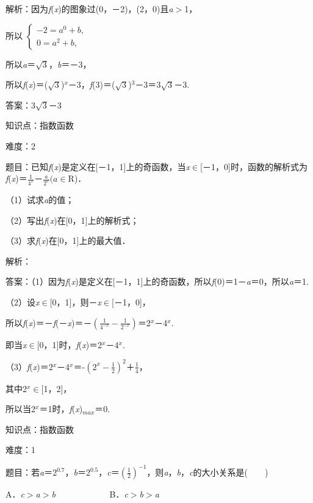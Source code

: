 \documentclass{article} %
\begin{document}
解析：因为\textit{f}(\textit{x})的图象过(0，－2)，(2，0)且\textit{a}$\mathrm{>}$1，

所以
$\left\{
\begin{array}{l}
-2=a^{0}+b,\\
0=a^{2}+b,
\end{array}
\right.
$

所以\textit{a}＝$\sqrt{3}$，\textit{b}＝－3，

所以\textit{f}(\textit{x})＝($\sqrt{3}$)\textit{${}^{x}$}－3，\textit{f}(3)＝($\sqrt{3}$)${}^{3}$－3＝$3\sqrt{3}$－3.

答案：$3\sqrt{3}$－3

知识点：指数函数

难度：2

题目：已知\textit{f}(\textit{x})是定义在[－1，1]上的奇函数，当\textit{x}$\mathrm{\in}$[－1，0]时，函数的解析式为\textit{f}(\textit{x})＝$\frac{1}{4^{x}}$－$\frac{a}{2^{x}}(\textit{a}$$\mathrm{\in}$R)．

（1）试求\textit{a}的值；

（2）写出\textit{f}(\textit{x})在[0，1]上的解析式；

（3）求\textit{f}(\textit{x})在[0，1]上的最大值．

解析：

答案：（1）因为\textit{f}(\textit{x})是定义在[－1，1]上的奇函数，所以\textit{f}(0)＝1－\textit{a}＝0，所以\textit{a}＝1.

（2）设\textit{x}$\mathrm{\in}$[0，1]，则－\textit{x}$\mathrm{\in}$[－1，0]，

所以\textit{f}(\textit{x})＝－\textit{f}(－\textit{x})＝$－(\frac{1}{4^{-x}}-\frac{1}{2^{-x}})$＝2\textit{${}^{x}$}－4\textit{${}^{x}$}.

即当\textit{x}$\mathrm{\in}$[0，1]时，\textit{f}(\textit{x})＝2\textit{${}^{x}$}－4\textit{${}^{x}$}.

（3）\textit{f}(\textit{x})＝2\textit{${}^{x}$}－4\textit{${}^{x}$}＝-$(2^{x}-\frac{1}{2})^{2}$＋$\frac{1}{4}$，

其中2\textit{${}^{x}$}$\mathrm{\in}$[1，2]，

所以当2\textit{${}^{x}$}＝1时，\textit{f}(\textit{x})${}_{max}$＝0.

知识点：指数函数

难度：1

题目：若\textit{a}＝2${}^{0.7}$，\textit{b}＝2${}^{0.5}$，\textit{c}＝$(\frac{1}{2})^{-1}$，则\textit{a}，\textit{b}，\textit{c}的大小关系是(　　)

A．\textit{c}$\mathrm{>}$\textit{a}$\mathrm{>}$\textit{b}　　　　　　 
B．\textit{c}$\mathrm{>}$\textit{b}$\mathrm{>}$\textit{a}
\end{document}

